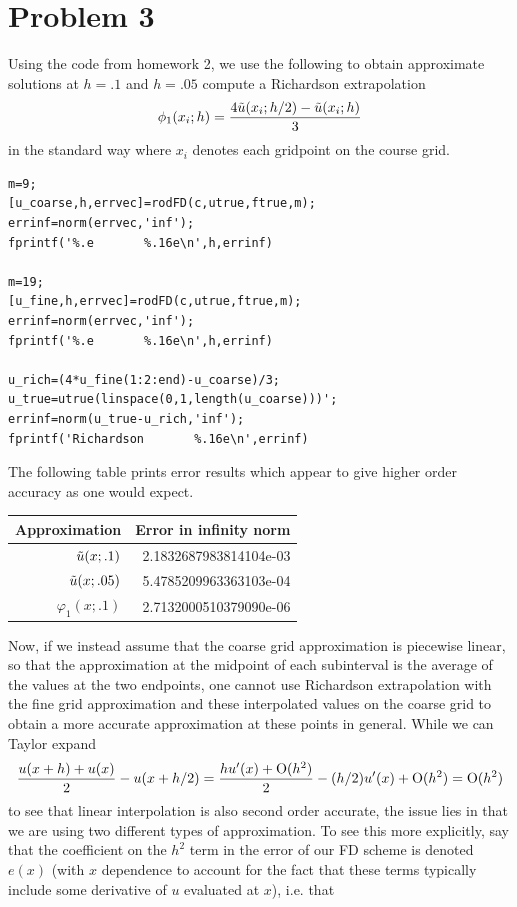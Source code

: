 \documentclass{article}
\begin{document}
\section{Problem 3}
Using the code from homework 2, we use the following to obtain approximate solutions at $h=.1$ and $h=.05$ compute a Richardson extrapolation 
\[
\phi_1(x_i;h)=\frac{4\Tilde{u}(x_i;h/2)-\Tilde{u}(x_i;h)}{3}
\]
in the standard way where $x_i$ denotes each gridpoint on the course grid.
\begin{verbatim}
m=9;
[u_coarse,h,errvec]=rodFD(c,utrue,ftrue,m);
errinf=norm(errvec,'inf');
fprintf('%.e       %.16e\n',h,errinf)

m=19;
[u_fine,h,errvec]=rodFD(c,utrue,ftrue,m);
errinf=norm(errvec,'inf');
fprintf('%.e       %.16e\n',h,errinf)

u_rich=(4*u_fine(1:2:end)-u_coarse)/3;
u_true=utrue(linspace(0,1,length(u_coarse)))';
errinf=norm(u_true-u_rich,'inf');
fprintf('Richardson       %.16e\n',errinf)
\end{verbatim}
The following table prints error results which appear to give higher order accuracy as one would expect.
\begin{table}[H]\centering
\begin{tabular}{|r|r|}\hline
{Approximation}&{Error in infinity norm}\\\hline
$\Tilde{u}(x;.1)$&2.1832687983814104e-03\\
$\Tilde{u}(x;.05)$&      5.4785209963363103e-04\\
$\varphi_1(x;.1)$&      2.7132000510379090e-06\\\hline
\end{tabular}
\end{table}
Now, if we instead assume that the coarse grid approximation is piecewise
linear, so that the approximation at the midpoint of each subinterval
is the average of the values at the two endpoints, one cannot use Richardson
extrapolation with the fine grid approximation and these interpolated
values on the coarse grid to obtain a more accurate approximation at
these points in general. While we can Taylor expand
\[
\frac{u(x+h)+u(x)}{2}-u(x+h/2)=\frac{hu'(x)+\operatorname{O}(h^2)}{2}-(h/2)u'(x)+\operatorname{O}(h^2)=\operatorname{O}(h^2)
\]
to see that linear interpolation is also second order accurate, the issue lies in that we are using two different types of approximation. To see this more explicitly, say that the coefficient on the $h^2$ term in the error of our FD scheme is denoted $e(x)$ (with $x$ dependence to account for the fact that these terms typically include some derivative of $u$ evaluated at $x$), i.e. that 
\end{document}
